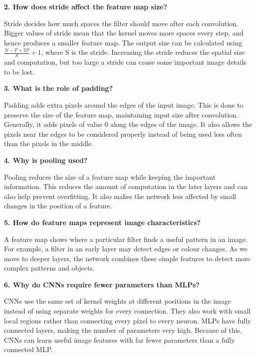 \documentclass[11pt]{article}
\begin{document}
\vspace{4mm}
\textbf{2. How does stride affect the feature map size?}

Stride decides how much spaces the filter should move after each convolution. Bigger values of stride mean that the kernel moves more spaces every step, and hence produces a smaller feature map.  The output size can be calculated using $\frac{N-F+2P}{S}+1$, where S is the stride. Increasing the stride reduces the spatial size and computation, but too large a stride can cause some important image details to be lost.

\vspace{4mm}
\textbf{3. What is the role of padding?}

Padding adds extra pixels around the edges of the input image. This is done to preserve the size of the feature map, maintaining input size after convolution. Generally, it adds pixels of value 0 along the edges of the image. It also allows the pixels near the edges to be considered properly instead of being used less often than the pixels in the middle.

\vspace{4mm}
\textbf{4. Why is pooling used?}

Pooling reduces the size of a feature map while keeping the important information. This reduces the amount of computation in the later layers and can also help prevent overfitting. It also makes the network less affected by small changes in the position of a feature.

\vspace{4mm}
\textbf{5. How do feature maps represent image characteristics?}

A feature map shows where a particular filter finds a useful pattern in an image. For example, a filter in an early layer may detect edges or colour changes. As we move to deeper layers, the network combines these simple features to detect more complex patterns and objects.

\vspace{4mm}
\textbf{6. Why do CNNs require fewer parameters than MLPs?}

CNNs use the same set of kernel weights at different positions in the image instead of using separate weights for every connection. They also work with small local regions rather than connecting every pixel to every neuron. MLPs have fully connected layers, making the number of parameters very high. Because of this, CNNs can learn useful image features with far fewer parameters than a fully connected MLP.
\end{document}
